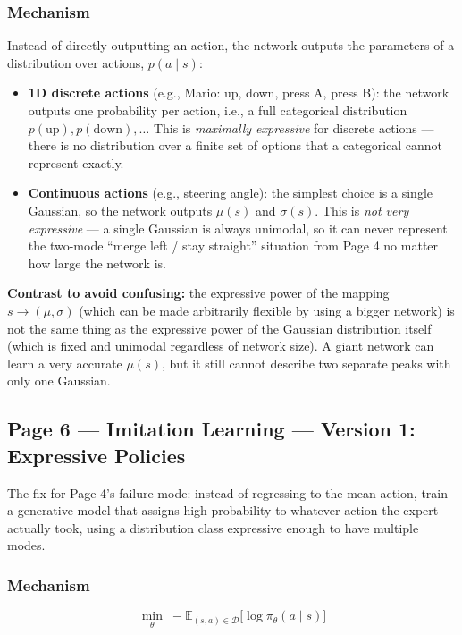 \subsubsection*{Mechanism}

Instead of directly outputting an action, the network outputs the parameters of a distribution over actions, $p(a \mid s)$:
\begin{itemize}
\item \textbf{1D discrete actions} (e.g., Mario: up, down, press A, press B): the network outputs one probability per action, i.e., a full categorical distribution $p(\text{up}), p(\text{down}), \dots$ This is \emph{maximally expressive} for discrete actions --- there is no distribution over a finite set of options that a categorical cannot represent exactly.
\item \textbf{Continuous actions} (e.g., steering angle): the simplest choice is a single Gaussian, so the network outputs $\mu(s)$ and $\sigma(s)$. This is \emph{not very expressive} --- a single Gaussian is always unimodal, so it can never represent the two-mode ``merge left / stay straight'' situation from Page 4 no matter how large the network is.
\end{itemize}

\textbf{Contrast to avoid confusing:} the expressive power of the mapping $s \to (\mu, \sigma)$ (which can be made arbitrarily flexible by using a bigger network) is not the same thing as the expressive power of the Gaussian distribution itself (which is fixed and unimodal regardless of network size). A giant network can learn a very accurate $\mu(s)$, but it still cannot describe two separate peaks with only one Gaussian.

\subsection*{Page 6 --- Imitation Learning --- Version 1: Expressive Policies}

The fix for Page 4's failure mode: instead of regressing to the mean action, train a generative model that assigns high probability to whatever action the expert actually took, using a distribution class expressive enough to have multiple modes.

\subsubsection*{Mechanism}

\[
\min_\theta \; -\mathbb{E}_{(s,a)\in\mathcal{D}}\big[\log \pi_\theta(a\mid s)\big]
\]

